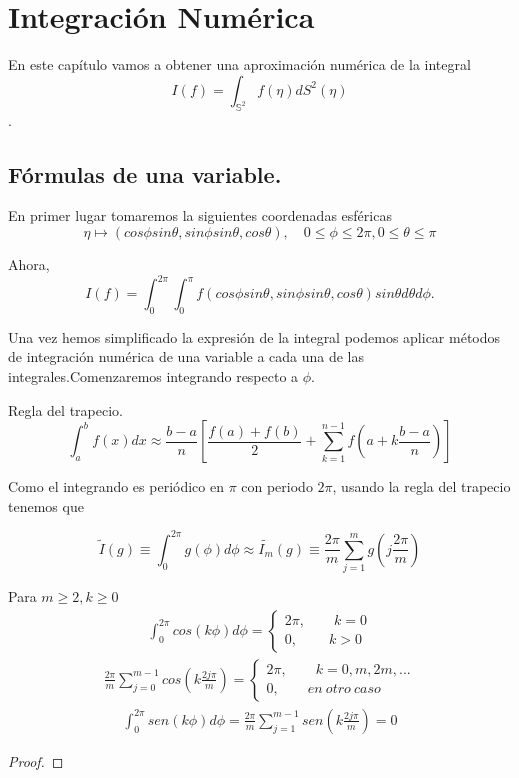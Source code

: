 \chapter[Integración Numérica]{Integración Numérica}
En este capítulo vamos a obtener una aproximación numérica de la integral $$ I(f) = \int_{\mathds{S}^2} f(\eta) dS^2(\eta) $$. 
\section{Fórmulas de una variable.}
En primer lugar tomaremos la siguientes coordenadas esféricas
$$ \eta \mapsto (cos\phi sin\theta, sin\phi sin\theta,cos \theta), \quad 0\le \phi \le 2\pi, 0\le \theta \le \pi$$
 
Ahora, 
$$
I(f) = \int_{0}^{2\pi} \int_{0}^{\pi} f(cos\phi sin\theta, sin\phi sin\theta,cos \theta)sin\theta d\theta d\phi. 
$$

Una vez hemos simplificado la expresión de la integral podemos aplicar métodos de integración numérica de una variable a cada una de las integrales.Comenzaremos integrando respecto a $\phi$.
\medskip
\begin{rem}Regla del trapecio.
	$$\int_{a}^{b} f(x)dx \approx \frac{b-a}{n}\left[\frac{f(a)+f(b)}{2}+\sum_{k=1}^{n-1}f(a+k\frac{b-a}{n})\right]
	$$
\end{rem}

Como el integrando es periódico en $\pi$ con periodo $2\pi$, usando la regla del trapecio tenemos que

$$
\widetilde{I}(g)\equiv \int_{0}^{2\pi} g(\phi)d\phi \approx \widetilde{I_m}(g) \equiv \frac{2\pi}{m} \sum_{j=1}^{m} g(j\frac{2\pi}{m})
$$

\begin{lem} Para $m\ge 2,k\ge 0$
	\begin{gather}
	\int_{0}^{2\pi} cos(k\phi)d\phi = \left\{\begin{array}{ll} 2\pi, \qquad k=0 
											\\ 0 ,  \qquad\  k>0
		\end{array} 
		\right.
	\end{gather}
	\begin{gather}
	\frac{2\pi}{m}\sum_{j=0}^{m-1}cos(k\frac{2j\pi}{m}) = \left\{\begin{array}{ll} 2\pi, \qquad k=0,m,2m,... 
	\\ 0 ,  \qquad en\ otro\ caso
	\end{array} 
	\right.
	\end{gather}
	\begin{gather}
	\int_{0}^{2\pi} sen(k\phi)d\phi =  \frac{2\pi}{m}\sum_{j=1}^{m-1}sen(k\frac{2j\pi}{m}) =0 
	\end{gather}
\end{lem}
\begin{proof}
\end{proof}

